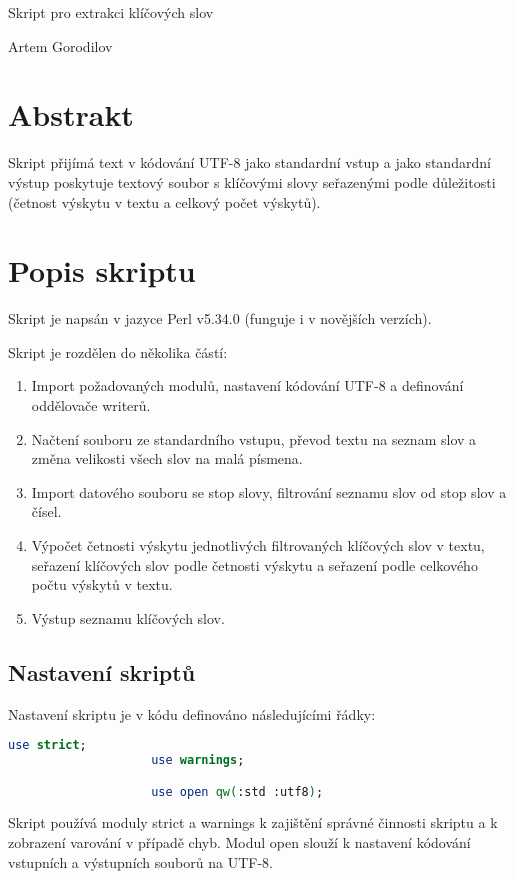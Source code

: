 \documentclass[a4paper,11pt]{article}
\begin{document}
\hline
\begin{center}
\bigskip
\huge Skript pro extrakci klíčových slov
\vspace{0.5cm}
\par \large Artem Gorodilov
\vspace{0.5cm}
\bigskip
\end{center}
\hline
\bigskip


\vskip10pt
\begin{minipage}[t]{0.5\textwidth} 
        \section{Abstrakt}    
            Skript přijímá text v kódování UTF-8 jako standardní vstup a jako standardní výstup poskytuje textový soubor s klíčovými slovy seřazenými podle důležitosti (četnost výskytu v textu a celkový počet výskytů).
        \section{Popis skriptu}
            Skript je napsán v jazyce Perl v5.34.0 \cite{perl} (funguje i v novějších verzích).
            \par Skript je rozdělen do několika částí: 
            \begin{enumerate}
                \item Import požadovaných modulů, nastavení kódování UTF-8 a definování oddělovače writerů.
                \item Načtení souboru ze standardního vstupu, převod textu na seznam slov a změna velikosti všech slov na malá písmena.
                \item Import datového souboru se stop slovy, filtrování seznamu slov od stop slov a čísel.
                \item Výpočet četnosti výskytu jednotlivých filtrovaných klíčových slov v textu, seřazení klíčových slov podle četnosti výskytu a seřazení podle celkového počtu výskytů v textu.
                \item Výstup seznamu klíčových slov.
            \end{enumerate}
        
            \subsection{Nastavení skriptů}
                Nastavení skriptu je v kódu definováno následujícími řádky:
                \begin{lstlisting}[language=Perl]
                    use strict;
                    use warnings;

                    use open qw(:std :utf8);
                \end{lstlisting}
                Skript používá moduly strict a warnings k zajištění správné činnosti skriptu a k zobrazení varování v případě chyb. Modul open slouží k nastavení kódování vstupních a výstupních souborů na UTF-8.
    \end{minipage}
\end{document}
